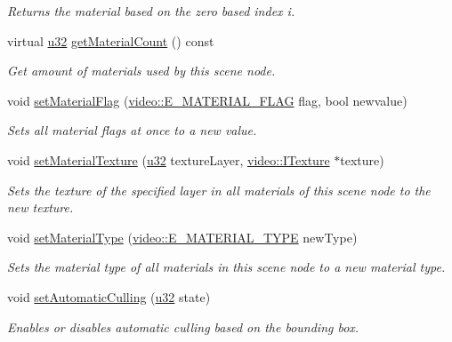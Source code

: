 \begin{DoxyCompactItemize}
\begin{DoxyCompactList}\small\item\em Returns the material based on the zero based index i. \end{DoxyCompactList}\item 
virtual \hyperlink{namespaceirr_a0416a53257075833e7002efd0a18e804}{u32} \hyperlink{classirr_1_1scene_1_1ISceneNode_afa904bf3742941087aaee56b0b4cdfe2}{get\+Material\+Count} () const 
\begin{DoxyCompactList}\small\item\em Get amount of materials used by this scene node. \end{DoxyCompactList}\item 
void \hyperlink{classirr_1_1scene_1_1ISceneNode_a2841d5077854b9981711a403f33762cd}{set\+Material\+Flag} (\hyperlink{namespaceirr_1_1video_a8a3bc00ae8137535b9fbc5f40add70d3}{video\+::\+E\+\_\+\+M\+A\+T\+E\+R\+I\+A\+L\+\_\+\+F\+L\+AG} flag, bool newvalue)
\begin{DoxyCompactList}\small\item\em Sets all material flags at once to a new value. \end{DoxyCompactList}\item 
void \hyperlink{classirr_1_1scene_1_1ISceneNode_a0d5d2e05ebe08e6a432fbb4fd1d28dd0}{set\+Material\+Texture} (\hyperlink{namespaceirr_a0416a53257075833e7002efd0a18e804}{u32} texture\+Layer, \hyperlink{classirr_1_1video_1_1ITexture}{video\+::\+I\+Texture} $\ast$texture)
\begin{DoxyCompactList}\small\item\em Sets the texture of the specified layer in all materials of this scene node to the new texture. \end{DoxyCompactList}\item 
void \hyperlink{classirr_1_1scene_1_1ISceneNode_a302c7dedd776b52111823df5ed8446de}{set\+Material\+Type} (\hyperlink{namespaceirr_1_1video_ac8e9b6c66f7cebabd1a6d30cbc5430f1}{video\+::\+E\+\_\+\+M\+A\+T\+E\+R\+I\+A\+L\+\_\+\+T\+Y\+PE} new\+Type)
\begin{DoxyCompactList}\small\item\em Sets the material type of all materials in this scene node to a new material type. \end{DoxyCompactList}\item 
void \hyperlink{classirr_1_1scene_1_1ISceneNode_a5fcd62dbf524b8d2d6daa61c7d6cf119}{set\+Automatic\+Culling} (\hyperlink{namespaceirr_a0416a53257075833e7002efd0a18e804}{u32} state)
\begin{DoxyCompactList}\small\item\em Enables or disables automatic culling based on the bounding box. \end{DoxyCompactList}\item 

\end{DoxyCompactItemize}
